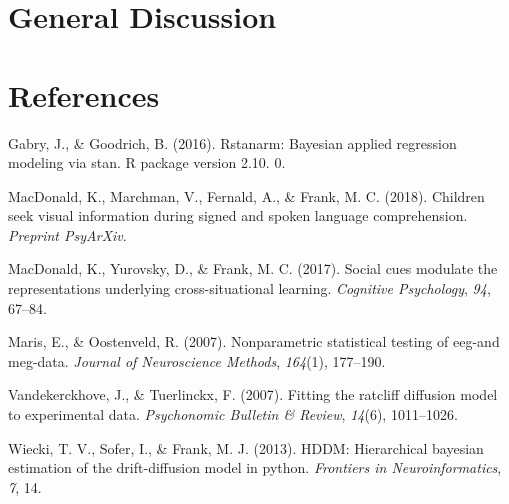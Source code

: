 \documentclass[man,floatsintext]{apa6}
\begin{document}
\hypertarget{general-discussion}{%
\section{General Discussion}\label{general-discussion}}

\newpage

\hypertarget{references}{%
\section{References}\label{references}}

\begingroup
\setlength{\parindent}{-0.5in}
\setlength{\leftskip}{0.5in}

\hypertarget{refs}{}
\leavevmode\hypertarget{ref-gabry2016rstanarm}{}%
Gabry, J., \& Goodrich, B. (2016). Rstanarm: Bayesian applied regression
modeling via stan. R package version 2.10. 0.

\leavevmode\hypertarget{ref-macdonald2018speed}{}%
MacDonald, K., Marchman, V., Fernald, A., \& Frank, M. C. (2018).
Children seek visual information during signed and spoken language
comprehension. \emph{Preprint PsyArXiv}.

\leavevmode\hypertarget{ref-macdonald2017social}{}%
MacDonald, K., Yurovsky, D., \& Frank, M. C. (2017). Social cues
modulate the representations underlying cross-situational learning.
\emph{Cognitive Psychology}, \emph{94}, 67--84.

\leavevmode\hypertarget{ref-maris2007nonparametric}{}%
Maris, E., \& Oostenveld, R. (2007). Nonparametric statistical testing
of eeg-and meg-data. \emph{Journal of Neuroscience Methods},
\emph{164}(1), 177--190.

\leavevmode\hypertarget{ref-vandekerckhove2007fitting}{}%
Vandekerckhove, J., \& Tuerlinckx, F. (2007). Fitting the ratcliff
diffusion model to experimental data. \emph{Psychonomic Bulletin \&
Review}, \emph{14}(6), 1011--1026.

\leavevmode\hypertarget{ref-wiecki2013hddm}{}%
Wiecki, T. V., Sofer, I., \& Frank, M. J. (2013). HDDM: Hierarchical
bayesian estimation of the drift-diffusion model in python.
\emph{Frontiers in Neuroinformatics}, \emph{7}, 14.

\endgroup
\end{document}
